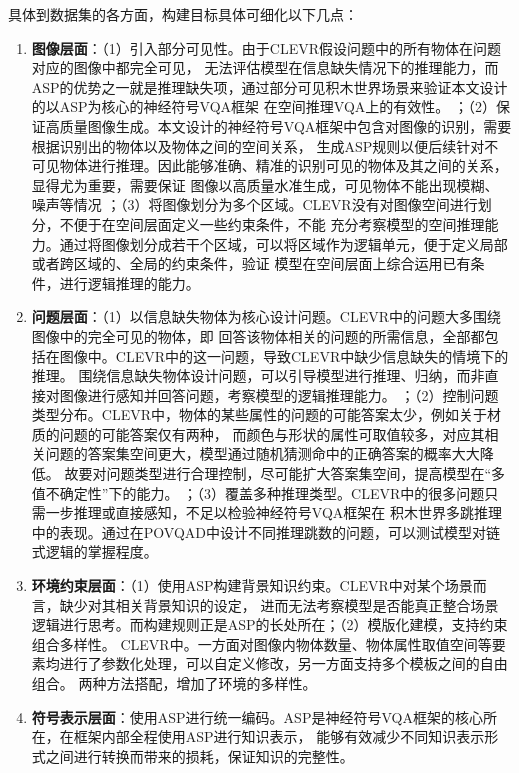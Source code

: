 具体到数据集的各方面，构建目标具体可细化以下几点：
\begin{enumerate}[nosep]
\item \textbf{图像层面}：（1）引入部分可见性。由于CLEVR假设问题中的所有物体在问题对应的图像中都完全可见，
无法评估模型在信息缺失情况下的推理能力，而ASP的优势之一就是推理缺失项\cite{fandinno2021planningincompleteinformationquantified}，通过部分可见积木世界场景来验证本文设计的以ASP为核心的神经符号VQA框架
在空间推理VQA上的有效性。
；（2）保证高质量图像生成。本文设计的神经符号VQA框架中包含对图像的识别，需要根据识别出的物体以及物体之间的空间关系，
生成ASP规则以便后续针对不可见物体进行推理。因此能够准确、精准的识别可见的物体及其之间的关系，显得尤为重要，需要保证
图像以高质量水准生成，可见物体不能出现模糊、噪声等情况
；（3）将图像划分为多个区域。CLEVR没有对图像空间进行划分，不便于在空间层面定义一些约束条件，不能
充分考察模型的空间推理能力。通过将图像划分成若干个区域，可以将区域作为逻辑单元，便于定义局部或者跨区域的、全局的约束条件，验证
模型在空间层面上综合运用已有条件，进行逻辑推理的能力。
\item \textbf{问题层面}：（1）以信息缺失物体为核心设计问题。CLEVR中的问题大多围绕图像中的完全可见的物体，即
回答该物体相关的问题的所需信息，全部都包括在图像中。CLEVR中的这一问题，导致CLEVR中缺少信息缺失的情境下的推理。
围绕信息缺失物体设计问题，可以引导模型进行推理、归纳，而非直接对图像进行感知并回答问题，考察模型的逻辑推理能力。
；（2）控制问题类型分布。CLEVR中，物体的某些属性的问题的可能答案太少，例如关于材质的问题的可能答案仅有两种，
而颜色与形状的属性可取值较多，对应其相关问题的答案集空间更大，模型通过随机猜测命中的正确答案的概率大大降低。
故要对问题类型进行合理控制，尽可能扩大答案集空间，提高模型在“多值不确定性”下的能力。
；（3）覆盖多种推理类型。CLEVR中的很多问题只需一步推理或直接感知，不足以检验神经符号VQA框架在
积木世界多跳推理中的表现。通过在POVQAD中设计不同推理跳数的问题，可以测试模型对链式逻辑的掌握程度。
\item \textbf{环境约束层面}：（1）使用ASP构建背景知识约束。CLEVR中对某个场景而言，缺少对其相关背景知识的设定，
进而无法考察模型是否能真正整合场景逻辑进行思考。而构建规则正是ASP的长处所在；（2）模版化建模，支持约束组合多样性。
CLEVR中。一方面对图像内物体数量、物体属性取值空间等要素均进行了参数化处理，可以自定义修改，另一方面支持多个模板之间的自由组合。
两种方法搭配，增加了环境的多样性。
\item \textbf{符号表示层面}：使用ASP进行统一编码。ASP是神经符号VQA框架的核心所在，在框架内部全程使用ASP进行知识表示，
能够有效减少不同知识表示形式之间进行转换而带来的损耗，保证知识的完整性。
\end{enumerate}

